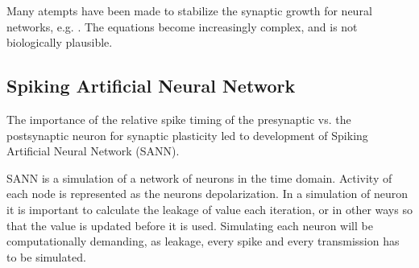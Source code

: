 	Many atempts have been made to stabilize the synaptic growth for neural networks, e.g. \cite{hebbUstabilt}. %
	The equations become increasingly complex, and is not biologically plausible.


\subsection{Spiking Artificial Neural Network}
\label{ssecSpikinANN}
The importance of the relative spike timing of the presynaptic vs. the postsynaptic neuron for synaptic plasticity led to development of Spiking Artificial Neural Network (SANN). 

SANN is a simulation of a network of neurons in the time domain. Activity of each node is represented as the neurons depolarization. 
In a simulation of neuron it is important to calculate the leakage of value each iteration, or in other ways so that the value is updated before it is used. 
Simulating each neuron will be computationally demanding, as leakage, every spike and every transmission has to be simulated. %

